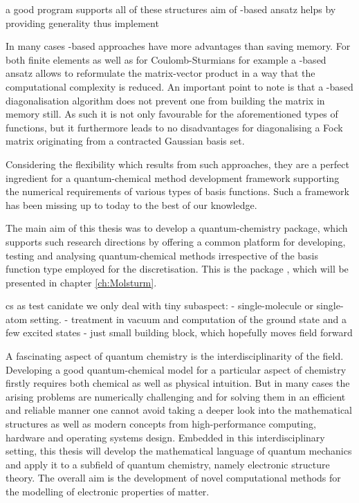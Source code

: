 a good program supports all of these structures
aim of \molsturm
\contraction-based ansatz helps by providing generality
thus implement \lazyten



In many cases \contraction-based approaches
have more advantages than saving memory.
For both finite elements as well as for Coulomb-Sturmians
for example a \contraction-based ansatz
allows to reformulate the matrix-vector product in a way
that the computational complexity is reduced.
An important point to note is that
a \contraction-based diagonalisation algorithm
does not prevent one from building the matrix in memory still.
As such it is not only favourable for the aforementioned
types of functions,
but it furthermore leads to no disadvantages
for diagonalising a Fock matrix originating from
a contracted Gaussian basis set.

Considering the flexibility which results from such approaches,
they are a perfect ingredient for
a quantum-chemical method development framework
supporting the numerical requirements of various types of basis functions.
Such a framework has been missing up to today to the best of our knowledge.

The main aim of this thesis was to develop a quantum-chemistry
package, which supports such research directions
by offering a common platform for developing, testing and analysing
quantum-chemical methods irrespective of the basis function type employed for
the discretisation.
This is the package \molsturm,
which will be presented in chapter \vref{ch:Molsturm}.




cs as test canidate
we only deal with tiny subaspect:
- single-molecule or single-atom setting.
- treatment in vacuum and computation of the ground state and a few excited states
- just small building block, which hopefully moves field forward 



A fascinating aspect of quantum chemistry is the interdisciplinarity of the field.
Developing a good quantum-chemical model for a particular aspect of chemistry
firstly requires both chemical as well as physical intuition.
But in many cases the arising problems are numerically challenging
and for solving them in an efficient and reliable manner
one cannot avoid taking a deeper look into the mathematical structures
as well as modern concepts from high-performance computing,
hardware and operating systems design.
Embedded in this interdisciplinary setting,
this thesis will develop the mathematical language of quantum mechanics
and apply it to a subfield of quantum chemistry,
namely electronic structure theory.
The overall aim is the development of novel computational methods
for the modelling of electronic properties of matter.

